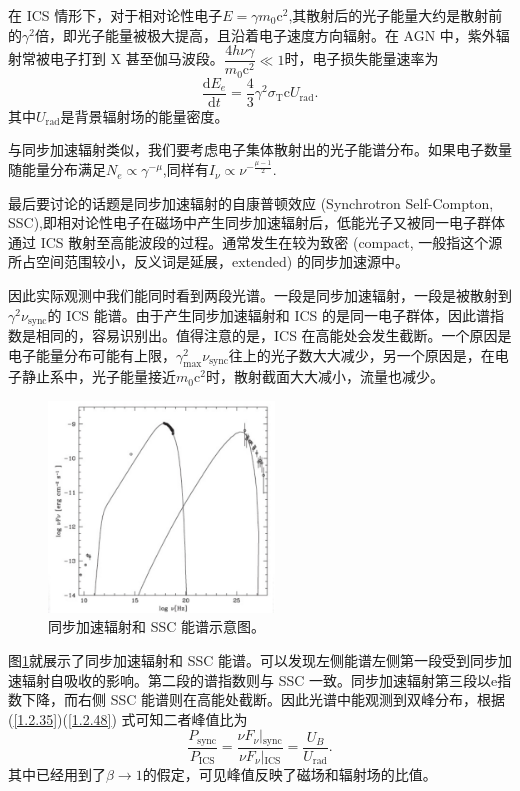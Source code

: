 \documentclass[../天体物理基础.tex]{subfiles}
\begin{document}
在 ICS 情形下，对于相对论性电子$E=\gamma m_{0}\mathrm{c}^{2}$,其散射后的光子能量大约是散射前的$\gamma^{2}$倍，即光子能量被极大提高，且沿着电子速度方向辐射。在 AGN 中，紫外辐射常被电子打到 X 甚至伽马波段。$\dfrac{4h\nu\gamma}{m_{0}\mathrm{c}^{2}}\ll1$时，电子损失能量速率为
\begin{equation}
\frac{\mathrm{d}E_{e}}{\mathrm{d}t}=\frac{4}{3}\gamma^{2}\sigma_{\text{T}}\mathrm{c}U_{\text{rad}}.\label{1.2.48}
\end{equation}
其中$U_{\text{rad}}$是背景辐射场的能量密度。

与同步加速辐射类似，我们要考虑电子集体散射出的光子能谱分布。如果电子数量随能量分布满足$N_{e}\propto{}\gamma^{-\mu}$,同样有$I_{\nu}\propto{}\nu^{-\frac{\mu-1}{2}}$.

最后要讨论的话题是同步加速辐射的自康普顿效应 (Synchrotron Self-Compton, SSC),即相对论性电子在磁场中产生同步加速辐射后，低能光子又被同一电子群体通过 ICS 散射至高能波段的过程。通常发生在较为致密 (compact, 一般指这个源所占空间范围较小，反义词是延展，extended) 的同步加速源中。

因此实际观测中我们能同时看到两段光谱。一段是同步加速辐射，一段是被散射到$\gamma^{2}\nu_{\text{sync}}$的 ICS 能谱。由于产生同步加速辐射和 ICS 的是同一电子群体，因此谱指数是相同的，容易识别出。值得注意的是，ICS 在高能处会发生截断。一个原因是电子能量分布可能有上限，$\gamma_{\max}^{2}\nu_{\text{sync}}$往上的光子数大大减少，另一个原因是，在电子静止系中，光子能量接近$m_{0}\mathrm{c}^{2}$时，散射截面大大减小，流量也减少。

\begin{figure}[!htbp]
\centering
\includegraphics[width=6cm]{figures/figure1_9.png}
\captionsetup{justification=raggedright, singlelinecheck=false}
\caption{同步加速辐射和 SSC 能谱示意图。}
\label{同步加速辐射和 SSC 能谱示意图。}
\end{figure}

图\ref{同步加速辐射和 SSC 能谱示意图。}就展示了同步加速辐射和 SSC 能谱。可以发现左侧能谱左侧第一段受到同步加速辐射自吸收的影响。第二段的谱指数则与 SSC 一致。同步加速辐射第三段以$\mathrm{e}$指数下降，而右侧 SSC 能谱则在高能处截断。因此光谱中能观测到双峰分布，根据 (\ref{1.2.35})(\ref{1.2.48}) 式可知二者峰值比为
\begin{equation}
\frac{P_{\text{sync}}}{P_{\text{ICS}}}=\frac{\left.\nu F_{\nu}\right\vert{}_{\text{sync}}}{\left.\nu F_{\nu}\right\vert{}_{\text{ICS}}}=\frac{U_{B}}{U_{\text{rad}}}.
\end{equation}
其中已经用到了$\beta\to1$的假定，可见峰值反映了磁场和辐射场的比值。
\end{document}
